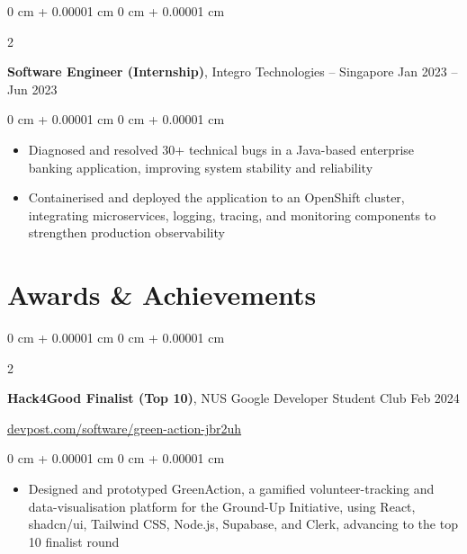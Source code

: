 \documentclass[10pt, letterpaper]{article}
\newenvironment{highlights}{
    \begin{itemize}[
        topsep=0.05 cm,
        parsep=0.05 cm,
        partopsep=0pt,
        itemsep=0pt,
        leftmargin=0 cm + 10pt
    ]
}{
    \end{itemize}
} %
\newenvironment{onecolentry}{
    \begin{adjustwidth}{
        0 cm + 0.00001 cm
    }{
        0 cm + 0.00001 cm
    }
}{
    \end{adjustwidth}
} %
\newenvironment{twocolentry}[2][]{
    \onecolentry
    \def\secondColumn{#2}
    \setcolumnwidth{\fill, 4.5 cm}
    \begin{paracol}{2}
}{
    \switchcolumn \raggedleft \secondColumn
    \end{paracol}
    \endonecolentry
} %
\begin{document}
        \vspace{0.12 cm}

        \begin{twocolentry}{
            Jan 2023 -- Jun 2023
        }
            \textbf{Software Engineer (Internship)}, Integro Technologies -- Singapore\end{twocolentry}

        \vspace{0.06 cm}
        \begin{onecolentry}
            \begin{highlights}
                 \item Diagnosed and resolved 30+ technical bugs in a Java-based enterprise banking application, improving system stability and reliability
                 \item Containerised and deployed the application to an OpenShift cluster, integrating microservices, logging, tracing, and monitoring components to strengthen production observability
            \end{highlights}
        \end{onecolentry}



    
    \section{Awards \& Achievements}



        
        \begin{twocolentry}{
            Feb 2024
        }
            \textbf{Hack4Good Finalist (Top 10)}, NUS Google Developer Student Club\end{twocolentry}

            \href{https://devpost.com/software/green-action-jbr2uh}{devpost.com/software/green-action-jbr2uh}

        \vspace{0.06 cm}
        \begin{onecolentry}
            \begin{highlights}
                \item Designed and prototyped GreenAction, a gamified volunteer-tracking and data-visualisation platform for the Ground-Up Initiative, using React, shadcn/ui, Tailwind CSS, Node.js, Supabase, and Clerk, advancing to the top 10 finalist round
            \end{highlights}
        \end{onecolentry}
\end{document}
